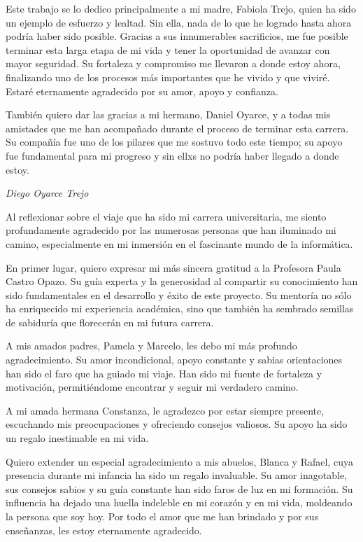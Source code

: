 Este trabajo se lo dedico principalmente a mi madre, Fabiola Trejo, quien ha sido un ejemplo de esfuerzo y lealtad. Sin ella, nada de lo que he logrado hasta ahora podría haber sido posible. Gracias a sus innumerables sacrificios, me fue posible terminar esta larga etapa de mi vida y tener la oportunidad de avanzar con mayor seguridad. Su fortaleza y compromiso me llevaron a donde estoy ahora, finalizando uno de los procesos más importantes que he vivido y que viviré. Estaré eternamente agradecido por su amor, apoyo y confianza.

También quiero dar las gracias a mi hermano, Daniel Oyarce, y a todas mis amistades que me han acompañado durante el proceso de terminar esta carrera. Su compañía fue uno de los pilares que me sostuvo todo este tiempo; su apoyo fue fundamental para mi progreso y sin ellxs no podría haber llegado a donde estoy.

\textit{Diego Oyarce Trejo}

\newpage
Al reflexionar sobre el viaje que ha sido mi carrera universitaria, me siento profundamente agradecido por las numerosas personas que han iluminado mi camino, especialmente en mi inmersión en el fascinante mundo de la informática.

En primer lugar, quiero expresar mi más sincera gratitud a la Profesora Paula Castro Opazo. Su guía experta y la generosidad al compartir su conocimiento han sido fundamentales en el desarrollo y éxito de este proyecto. Su mentoría no sólo ha enriquecido mi experiencia académica, sino que también ha sembrado semillas de sabiduría que florecerán en mi futura carrera.

A mis amados padres, Pamela y Marcelo, les debo mi más profundo agradecimiento. Su amor incondicional, apoyo constante y sabias orientaciones han sido el faro que ha guiado mi viaje. Han sido mi fuente de fortaleza y motivación, permitiéndome encontrar y seguir mi verdadero camino.

A mi amada hermana Constanza, le agradezco por estar siempre presente, escuchando mis preocupaciones y ofreciendo consejos valiosos. Su apoyo ha sido un regalo inestimable en mi vida.

Quiero extender un especial agradecimiento a mis abuelos, Blanca y Rafael, cuya presencia durante mi infancia ha sido un regalo invaluable. Su amor inagotable, sus consejos sabios y su guía constante han sido faros de luz en mi formación. Su influencia ha dejado una huella indeleble en mi corazón y en mi vida, moldeando la persona que soy hoy. Por todo el amor que me han brindado y por sus enseñanzas, les estoy eternamente agradecido.

